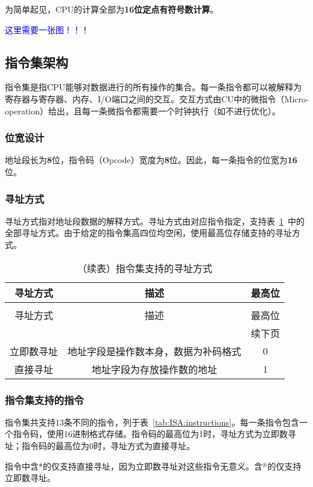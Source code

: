\documentclass[lang=cn,a4paper,newtx]{elegantpaper}
\begin{document}
为简单起见，CPU的计算全部为\textbf{16位定点有符号数计算}。

\textcolor{blue}{这里需要一张图！！！}




\subsection{指令集架构}
指令集是指CPU能够对数据进行的所有操作的集合。每一条指令都可以被解释为寄存器与寄存器、内存、I/O端口之间的交互。交互方式由CU中的微指令（Micro-operation）给出，且每一条微指令都需要一个时钟执行（如不进行优化）。
\subsubsection{位宽设计}
地址段长为\textbf{8}位，指令码（Opcode）宽度为\textbf{8}位。因此，每一条指令的位宽为\textbf{16}位。
\subsubsection{寻址方式}
寻址方式指对地址段数据的解释方式。寻址方式由对应指令指定，支持表~\ref{tab:ISA:addressingmode}~中的全部寻址方式。由于给定的指令集高四位均空闲，使用最高位存储支持的寻址方式。
\begin{longtable}{c c c}
  \caption{指令集支持的寻址方式} \label{tab:ISA:addressingmode} \\
  \toprule
  寻址方式  & 描述 & 最高位\\
  \midrule
  \endfirsthead
  
  \caption[]{（续表）指令集支持的寻址方式} \\
  \toprule
  寻址方式  & 描述 & 最高位\\
  \midrule
  \endhead
  
  \midrule
  \multicolumn{3}{r}{续下页} \\
  \midrule
  \endfoot
  
  \bottomrule
  \endlastfoot
  
  立即数寻址   &  地址字段是操作数本身，数据为补码格式  & 0\\
  直接寻址 &  地址字段为存放操作数的地址    & 1\\
\end{longtable}

\subsubsection{指令集支持的指令}
指令集共支持13条不同的指令，列于表~\ref{tab:ISA:instructions}。每一条指令包含一个指令码，使用16进制格式存储。指令码的最高位为1时，寻址方式为立即数寻址；指令码的最高位为0时，寻址方式为直接寻址。
\begin{remark}
  指令中含*的仅支持直接寻址，因为立即数寻址对这些指令无意义。含$^\circledast$的仅支持立即数寻址。
\end{remark}
\end{document}
